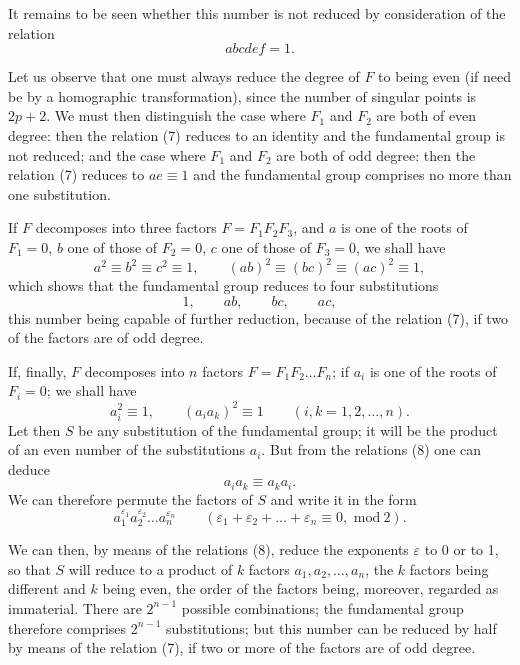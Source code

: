 \documentclass{article}
\begin{document}
It remains to be seen whether this number is not reduced by consideration of the relation
\[ abcdef = 1. \tag{7} \]

Let us observe that one must always reduce the degree of $F$ to being even (if need be by a homographic transformation), since the number of singular points is $2p + 2$. We must then distinguish the case where $F_{1}$ and $F_{2}$ are both of even degree: then
the relation (7) reduces to an identity and the fundamental group is not reduced; and the case where $F_{1}$ and $F_{2}$ are both of odd degree: then the relation (7) reduces to $ae \equiv 1$ and the fundamental group comprises no more than one substitution.

If $F$ decomposes into three factors $F = F_{1}F_{2}F_{3}$, and $a$ is one of the roots of $F_{1} = 0$, $b$ one of those of $F_{2} = 0$, $c$ one of those of $F_{3} = 0$, we shall have
\[ a^{2} \equiv b^{2} \equiv c^{2} \equiv 1, \qquad (ab)^{2} \equiv (bc)^{2} \equiv (ac)^{2} \equiv 1, \]
which shows that the fundamental group reduces to four substitutions
\[ 1, \qquad ab, \qquad bc, \qquad ac, \]
this number being capable of further reduction, because of the relation (7), if two of the factors are of odd degree.

If, finally, $F$ decomposes into $n$ factors $F = F_{1}F_{2}\ldots F_{n}$; if $a_{i}$ is one of the roots of $F_{i} = 0$; we shall have
\[ a^{2}_{i} \equiv 1, \qquad (a_{i}a_{k})^{2} \equiv 1 \qquad (i, k = 1, 2, \ldots, n). \tag{8} \]
Let then $S$ be any substitution of the fundamental group; it will be the product of an even number of the substitutions $a_{i}$. But from the relations (8) one can deduce
\[ a_{i}a_{k} \equiv a_{k}a_{i}. \]
We can therefore permute the factors of $S$ and write it in the form
\[ a^{\varepsilon_{1}}_{1} a^{\varepsilon_{2}}_{2} \ldots a^{\varepsilon_{n}}_{n} \qquad (\varepsilon_{1} + \varepsilon_{2} + \ldots + \varepsilon_{n} \equiv 0, \text{ mod}\ 2). \]

We can then, by means of the relations (8), reduce the exponents $\varepsilon$ to 0 or to 1, so that $S$ will reduce to a product of $k$ factors $a_{1}, a_{2}, \ldots, a_{n}$, the $k$ factors being different and $k$ being even, the order of the factors being, moreover, regarded as immaterial. There are $2^{n-1}$ possible combinations; the fundamental group therefore comprises $2^{n-1}$ substitutions; but this number can be reduced by half by means of the relation (7), if two or more of the factors are of odd degree.
\end{document}
